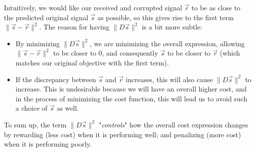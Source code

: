 \begin{enumerate}
{    Intuitively, we would like our received and corrupted signal $\vec{r}$ to be as close to the predicted original signal $\vec{s}$ as possible, so this gives rise to the first term $\|\vec{s} - \vec{r}\|^2$. The reason for having $\|D\vec{s}\|^2$ is a bit more subtle:
    \begin{itemize}
        \item By minimizing $\|D\vec{s}\|^2$, we are minimizing the overall expression, allowing $\|\vec{s} - \vec{r}\|^2$ to be closer to 0, and consequently $\vec{s}$ to be closer to $\vec{r}$ (which matches our original objective with the first term).
        \item If the discrepancy between $\vec{s}$ and $\vec{r}$ increases, this will also cause $\|D\vec{s}\|^2$ to increase. This is undesirable because we will have an overall higher cost, and in the process of minimizing the cost function, this will lead us to avoid such a choice of $\vec{s}$ as well.
    \end{itemize}
    To sum up, the term $\|D\vec{s}\|^2$ "\textit{controls}" how the overall cost expression changes by rewarding (less cost) when it is performing well; and penalizing (more cost) when it is performing poorly.
}
\end{enumerate}
